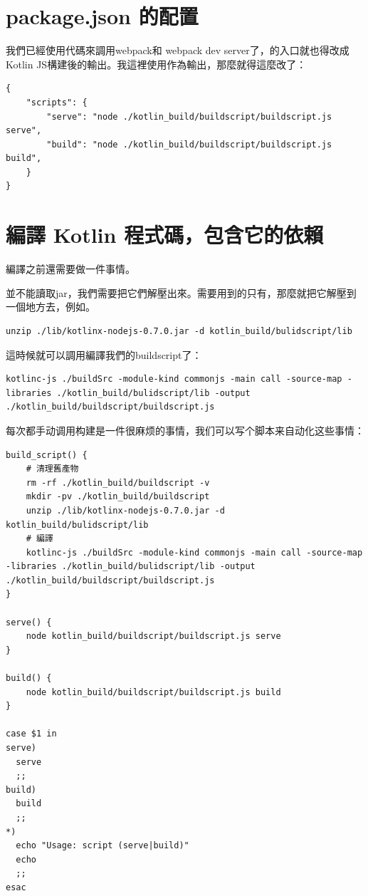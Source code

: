 \section*{package.json 的配置}

我們已經使用代碼來調用webpack和 webpack dev server了，的入口就也得改成Kotlin JS構建後的輸出。我這裡使用作為輸出，那麼就得這麼改了：

\begin{lstlisting}
{
    "scripts": {
        "serve": "node ./kotlin_build/buildscript/buildscript.js serve",
        "build": "node ./kotlin_build/buildscript/buildscript.js build",
    }
}
\end{lstlisting}






\section*{編譯 Kotlin 程式碼，包含它的依賴}

編譯之前還需要做一件事情。

並不能讀取jar，我們需要把它們解壓出來。需要用到的只有，那麼就把它解壓到一個地方去，例如。

\begin{lstlisting}
unzip ./lib/kotlinx-nodejs-0.7.0.jar -d kotlin_build/bulidscript/lib
\end{lstlisting}

這時候就可以調用編譯我們的buildscript了：

\begin{lstlisting}
kotlinc-js ./buildSrc -module-kind commonjs -main call -source-map -libraries ./kotlin_build/bulidscript/lib -output ./kotlin_build/buildscript/buildscript.js
\end{lstlisting}

每次都手动调用构建是一件很麻烦的事情，我们可以写个脚本来自动化这些事情：

\begin{lstlisting}
build_script() {
    # 清理舊產物
    rm -rf ./kotlin_build/buildscript -v 
    mkdir -pv ./kotlin_build/buildscript
    unzip ./lib/kotlinx-nodejs-0.7.0.jar -d kotlin_build/bulidscript/lib
    # 編譯
    kotlinc-js ./buildSrc -module-kind commonjs -main call -source-map -libraries ./kotlin_build/bulidscript/lib -output ./kotlin_build/buildscript/buildscript.js
}

serve() {
    node kotlin_build/buildscript/buildscript.js serve
}

build() {
    node kotlin_build/buildscript/buildscript.js build
}

case $1 in
serve)
  serve
  ;;
build)
  build
  ;;
*)
  echo "Usage: script (serve|build)"
  echo
  ;;
esac
\end{lstlisting}

